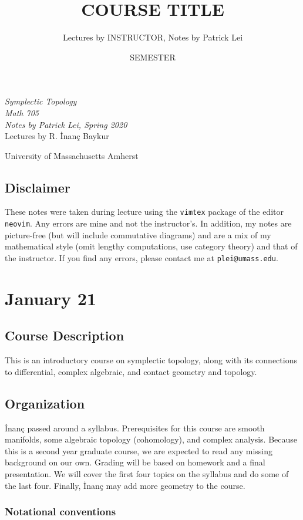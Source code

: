 \documentclass[leqno, openany]{memoir}
\title{COURSE TITLE}
\author{Lectures by INSTRUCTOR, Notes by Patrick Lei}
\date{SEMESTER}
\theoremstyle{definition}
\theoremstyle{remark}
\theoremstyle{plain}
\theoremstyle{definition}
\theoremstyle{remark}
\newcommand*{\titleSW}
    {\begingroup%
    \raggedleft
    \vspace*{\baselineskip}
    {\Huge\itshape Symplectic Topology \\ Math 705}\\[\baselineskip]
    {\large\itshape Notes by Patrick Lei,
                    Spring 2020}\\[0.2\textheight]
                    {\Large Lectures by R. \.Inan\c{c} Baykur}\par
    \vfill
    {\Large \sffamily University of Massachusetts Amherst}
    \vspace*{\baselineskip}
\endgroup}
\begin{document}
    
\begin{titlingpage}
\titleSW
\end{titlingpage}

\thispagestyle{empty}
\section*{Disclaimer}%
\label{sec:disclaimer}

These notes were taken during lecture using the \texttt{vimtex} package of the editor \texttt{neovim}. 
Any errors are mine and not the instructor's. 
In addition, my notes are picture-free (but will include commutative diagrams) and are a mix of my mathematical style 
(omit lengthy computations, use category theory) and that of the instructor.
If you find any errors, please contact me at \texttt{plei@umass.edu}.
\newpage



\tableofcontents

\chapter{January 21}%
\label{cha:january_21}

\section{Course Description}%
\label{sec:course_description}

This is an introductory course on symplectic topology, along with its connections to differential, complex algebraic, and contact geometry and topology.

\section{Organization}%
\label{sec:organization}

\.Inan\c{c} passed around a syllabus. Prerequisites for this course are smooth manifolds, some algebraic topology (cohomology), and complex analysis. Because this is a second year graduate course, we are expected to read any missing background on our own. Grading will be based on homework and a final presentation. We will cover the first four topics on the syllabus and do some of the last four. Finally, \.Inan\c{c} may add more geometry to the course.

\subsection{Notational conventions}%
\label{sub:notational_conventions}
\end{document}
